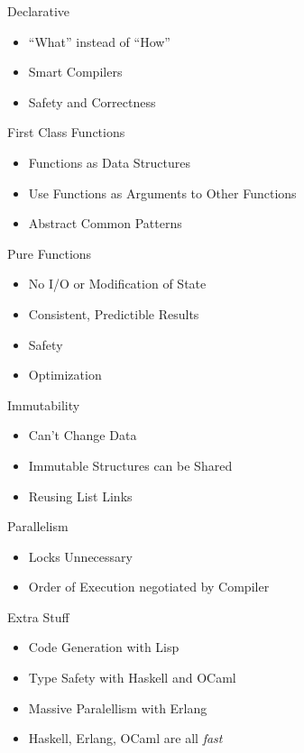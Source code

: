 \documentclass{beamer}                  %
\newcommand{\srule}{
	\rule{\textwidth}{1pt}\\
}
\newlength{\subsecwidth}
\newenvironment{slide}{
	\begin{frame} %
	\settowidth{\subsecwidth}{\insertsubsection} %
	\ifthenelse{\dimtest{\subsecwidth}{<}{1pt}}{ %
		\frametitle{\insertsection\\             %
		\vspace{-1ex}                            %
		\color{fore}\srule                       %
		\par                                     %
		\vspace{-3ex}                            %
		}
	}{                                           %
		\frametitle{\insertsection\ -- \insertsubsection\\ %
		\vspace{-1ex}                            %
		\color{fore}\srule                       %
		\par                                     %
		\vspace{-3ex}                            %
		}
	}
	\Large                                       %
}{
	\end{frame}
}
\begin{document}
\begin{slide}
  Declarative
  \begin{itemize}
    \item ``What'' instead of ``How''
    \item Smart Compilers
    \item Safety and Correctness
  \end{itemize}
\end{slide}

\begin{slide}
  First Class Functions
  \begin{itemize}
    \item Functions as Data Structures
    \item Use Functions as Arguments to Other Functions
    \item Abstract Common Patterns
  \end{itemize}
\end{slide}

\begin{slide}
  Pure Functions
  \begin{itemize}
    \item No I/O or Modification of State
    \item Consistent, Predictible Results
    \item Safety
    \item Optimization
  \end{itemize}
\end{slide}

\begin{slide}
  Immutability
  \begin{itemize}
    \item Can't Change Data
    \item Immutable Structures can be Shared
    \item Reusing List Links
  \end{itemize}
\end{slide}

\begin{slide}
  Parallelism
  \begin{itemize}
    \item Locks Unnecessary
    \item Order of Execution negotiated by Compiler
  \end{itemize}
\end{slide}

\begin{slide}
  Extra Stuff
  \begin{itemize}
    \item Code Generation with Lisp
    \item Type Safety with Haskell and OCaml
    \item Massive Paralellism with Erlang
    \item Haskell, Erlang, OCaml are all \textit{fast}
  \end{itemize}
\end{slide}
\end{document}
